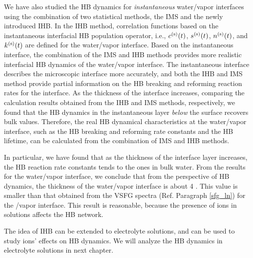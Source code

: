 We have also studied the HB dynamics for \emph{instantaneous} water/vapor interfaces using the combination 
of two statistical methods, the IMS and the newly introduced IHB.
In the IHB method, correlation functions based on the instantaneous interfacial HB population operator, 
i.e., $c^{(\text s)}(t)$, $s^{(\text s)}(t)$, $n^{(\text s)}(t)$, and $k^{(\text s)}(t)$ are defined for the water/vapor interface.
Based on the instantaneous interface, the combination of the IMS and
IHB methods provides more realistic interfacial HB dynamics of the water/vapor interface.  
The instantaneous interface describes the microscopic interface more accurately, 
and both the IHB and IMS method provide partial information on the HB breaking and reforming reaction rates for the interface. 
As the thickness of the interface increases, comparing the calculation results obtained from the IHB and IMS methods, respectively, 
we found that the HB dynamics in the instantaneous layer \emph{below} the surface recovers bulk values. 
Therefore, the real HB dynamical characteristics at the water/vapor interface, such as the HB breaking and reforming rate constants and the HB lifetime, 
can be calculated from the combination of IMS and IHB methods. 

In particular, we have found that as the thickness of the interface layer increases, 
the HB reaction rate constants tends to the ones in bulk water.
From the results for the water/vapor interface, we conclude that from the perspective of HB dynamics,
the thickness of the water/vapor interface is about 4 \A. This value is smaller than that obtained from the VSFG spectra 
(Ref. Paragraph \thinspace\ref{sfg_ln}) for the \LiN/vapor interface. 
This result is reasonable, because the presence of ions in solutions affects the HB network. 

The idea of IHB can be extended to electrolyte solutions, and can be used to study ions' effects on HB dynamics.
We will analyze the HB dynamics in electrolyte solutions in next chapter.


